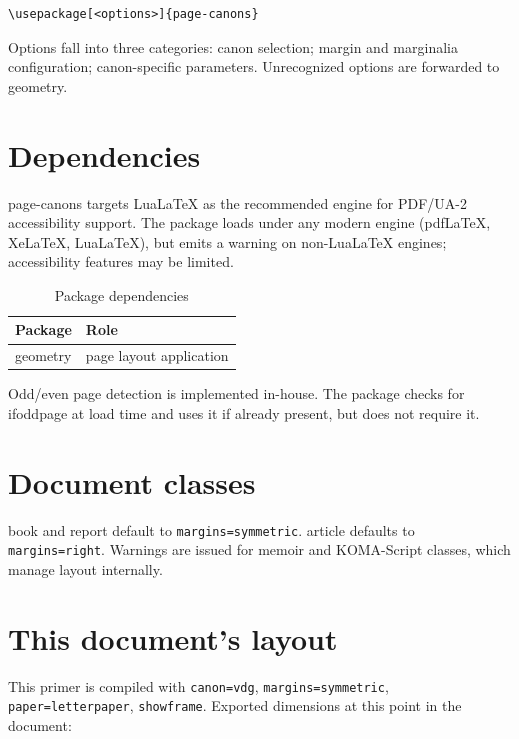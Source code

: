 \documentclass[11pt, twoside, openany]{book}
\newcommand{\pkg}[1]{\textsf{#1}}
\begin{document}
\begin{verbatim}
\usepackage[<options>]{page-canons}
\end{verbatim}

Options fall into three categories: canon selection; margin and marginalia configuration; canon-specific parameters. Unrecognized options are forwarded to \pkg{geometry}.

\section{Dependencies}\label{sec:dependencies}

\pkg{page-canons} targets Lua\LaTeX{} as the recommended engine for PDF/UA-2 accessibility support. The package loads under any modern engine (pdf\LaTeX, Xe\LaTeX, Lua\LaTeX), but emits a warning on non-Lua\LaTeX{} engines; accessibility features may be limited.

\begin{table}
    \centering
    \caption{Package dependencies}
    \label{tab:packagedependencies}
	\begin{tabular}{ll}
		\textbf{Package} & \textbf{Role}           \\
		\hline
		\pkg{geometry}   & page layout application \\
	\end{tabular}
\end{table}

Odd/even page detection is implemented in-house. The package checks for \pkg{ifoddpage} at load time and uses it if already present, but does not require it.

\section{Document classes}\label{sec:classes}

\pkg{book} and \pkg{report} default to \texttt{margins=symmetric}. \pkg{article} defaults to \texttt{margins=right}. Warnings are issued for \pkg{memoir} and KOMA-Script classes, which manage layout internally.

\section{This document's layout}\label{sec:thislayout}

This primer is compiled with \texttt{canon=vdg}, \texttt{margins=symmetric}, \texttt{paper=letterpaper}, \texttt{showframe}. Exported dimensions at this point in the document:
\end{document}
